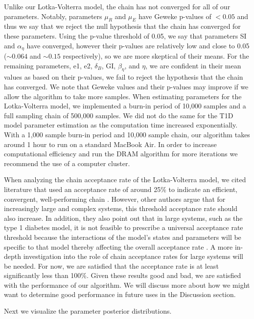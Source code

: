 Unlike our Lotka-Volterra model, the chain has not converged for all of our parameters. Notably, parameters $\mu_R$ and $\mu_E$ have Geweke p-values of $< 0.05$ and thus we say that we reject the null hypothesis that the chain has converged for these parameters. Using the p-value threshold of 0.05, we say that parameters SI and $\alpha_\eta$ have converged, however their p-values are relatively low and close to 0.05 ($\sim 0.064$ and $\sim 0.15$ respectively), so we are more skeptical of their means. For the remaining parameters, e1, e2, $\delta_B$, GI, $\beta_\eta$, and $\eta$, we are confident in their mean values as based on their p-values, we fail to reject the hypothesis that the chain has converged. We note that Geweke values and their p-values may improve if we allow the algorithm to take more samples. When estimating parameters for the Lotka-Volterra model, we implemented a burn-in period of 10,000 samples and a full sampling chain of 500,000 samples. We did not do the same for the T1D model parameter estimation as the computation time increased exponentially. With a 1,000 sample burn-in period and 10,000 sample chain, our algorithm takes around 1 hour to run on a standard MacBook Air. In order to increase computational efficiency and run the DRAM algorithm for more iterations we recommend the use of a computer cluster.
\par When analyzing the chain acceptance rate of the Lotka-Volterra model, we cited literature that used an acceptance rate of around 25\% to indicate an efficient, convergent, well-performing chain \cite{convergence}. However, other authors argue that for increasingly large and complex systems, this threshold acceptance rate should also increase. In addition, they also point out that in large systems, such as the type 1 diabetes model, it is not feasible to prescribe a universal acceptance rate threshold because the interactions of the model's states and parameters will be specific to that model thereby affecting the overall acceptance rate \cite{converge_threshold}. A more in-depth investigation into the role of chain acceptance rates for large systems will be needed. For now, we are satisfied that the acceptance rate is at least significantly less than 100\%. Given these results good and bad, we are satisfied with the performance of our algorithm. We will discuss more about how we might want to determine good performance in future uses in the Discussion section.
\par Next we visualize the parameter posterior distributions.

